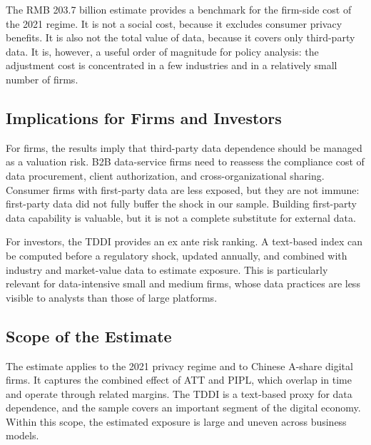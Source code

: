 The RMB 203.7 billion estimate provides a benchmark for the firm-side cost of the 2021 regime. It is not a social cost, because it excludes consumer privacy benefits. It is also not the total value of data, because it covers only third-party data. It is, however, a useful order of magnitude for policy analysis: the adjustment cost is concentrated in a few industries and in a relatively small number of firms.

\subsection{Implications for Firms and Investors}

For firms, the results imply that third-party data dependence should be managed as a valuation risk. B2B data-service firms need to reassess the compliance cost of data procurement, client authorization, and cross-organizational sharing. Consumer firms with first-party data are less exposed, but they are not immune: first-party data did not fully buffer the shock in our sample. Building first-party data capability is valuable, but it is not a complete substitute for external data.

For investors, the TDDI provides an ex ante risk ranking. A text-based index can be computed before a regulatory shock, updated annually, and combined with industry and market-value data to estimate exposure. This is particularly relevant for data-intensive small and medium firms, whose data practices are less visible to analysts than those of large platforms.

\subsection{Scope of the Estimate}

The estimate applies to the 2021 privacy regime and to Chinese A-share digital firms. It captures the combined effect of ATT and PIPL, which overlap in time and operate through related margins. The TDDI is a text-based proxy for data dependence, and the sample covers an important segment of the digital economy. Within this scope, the estimated exposure is large and uneven across business models.
